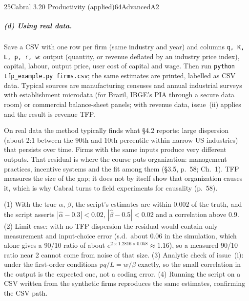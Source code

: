 \begin{exsol}{25}{Cabral 3.20 Productivity (applied)}{64}{Advanced}{A2}
\subparagraph{(d) Using real data.} Save a CSV with one row per firm (same industry and year) and
columns \texttt{q, K, L, p, r, w}: output (quantity, or revenue deflated by an industry price
index), capital, labour, output price, user cost of capital and wage. Then run
\texttt{python tfp\_example.py firms.csv}; the same estimates are printed, labelled as CSV
data. Typical sources are manufacturing censuses and annual industrial surveys with
establishment microdata (for Brazil, IBGE's PIA through a secure data room) or commercial
balance-sheet panels; with revenue data, issue~(ii) applies and the result is revenue TFP.

\interp On real data the method typically finds what \S4.2 reports: large dispersion (about 2:1
between the 90th and 10th percentile within narrow US industries) that persists over time.
Firms with the same inputs produce very different outputs. That residual is where the course
puts organization: management practices, incentive systems and the fit among them (\S3.5,
p.~58; \MR{} Ch.~1). TFP measures the size of the gap; it does not by itself show that
organization causes it, which is why Cabral turns to field experiments for causality (p.~58).

\verify (1) With the true $\alpha$, $\beta$, the script's estimates are within $0.002$ of the
truth, and the script asserts $|\hat\alpha - 0.3| < 0.02$, $|\hat\beta - 0.5| < 0.02$ and a
correlation above $0.9$. (2) Limit case: with no TFP dispersion the residual would contain only
measurement and input-choice error (s.d.\ about $0.06$ in the simulation, which alone gives a 90/10 ratio of about
$e^{2 \times 1.2816 \times 0.058} \approx 1.16$), so a measured 90/10 ratio near 2
cannot come from noise of that size. (3) Analytic check of issue~(i): under the first-order
conditions $pq/L = w/\beta$ exactly, so the small correlation in the output is the expected
one, not a coding error. (4) Running the script on a CSV written from the synthetic firms
reproduces the same estimates, confirming the CSV path.

\end{exsol}
